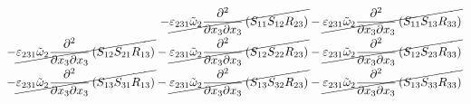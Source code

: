 \begin{equation}
\begin{split}
		-\cancel{\varepsilon_{231}\tilde{\omega}_{2}\pdv{}{x_{3}}{x_{3}}\left(S_{11}S_{12}R_{23}\right)}
		-\cancel{\varepsilon_{231}\tilde{\omega}_{2}\pdv{}{x_{3}}{x_{3}}\left(S_{11}S_{13}R_{33}\right)}\\
		-\cancel{\varepsilon_{231}\tilde{\omega}_{2}\pdv{}{x_{3}}{x_{3}}\left(S_{12}S_{21}R_{13}\right)}
		-\cancel{\varepsilon_{231}\tilde{\omega}_{2}\pdv{}{x_{3}}{x_{3}}\left(S_{12}S_{22}R_{23}\right)}
		-\cancel{\varepsilon_{231}\tilde{\omega}_{2}\pdv{}{x_{3}}{x_{3}}\left(S_{12}S_{23}R_{33}\right)}\\
		-\cancel{\varepsilon_{231}\tilde{\omega}_{2}\pdv{}{x_{3}}{x_{3}}\left(S_{13}S_{31}R_{13}\right)}
		-\cancel{\varepsilon_{231}\tilde{\omega}_{2}\pdv{}{x_{3}}{x_{3}}\left(S_{13}S_{32}R_{23}\right)}
		-\cancel{\varepsilon_{231}\tilde{\omega}_{2}\pdv{}{x_{3}}{x_{3}}\left(S_{13}S_{33}R_{33}\right)}\\
	\end{split}
\end{equation}
